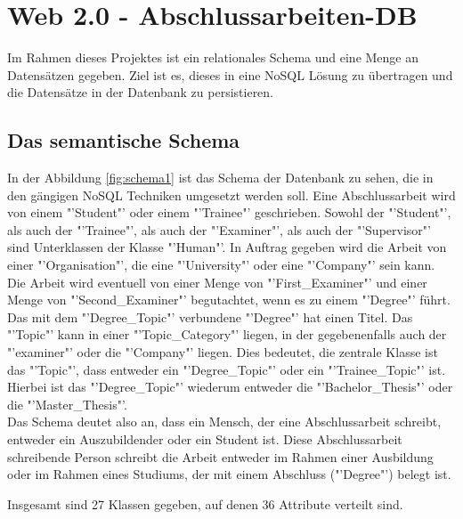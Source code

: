 \section{Web 2.0 - Abschlussarbeiten-DB}
Im Rahmen dieses Projektes ist ein relationales Schema und eine Menge an Datens\"atzen gegeben. Ziel ist es, dieses in eine NoSQL Lösung zu übertragen und die Datens\"atze in der Datenbank zu persistieren.

\subsection{Das semantische Schema}
In der Abbildung \ref{fig:schema1} ist das Schema der Datenbank zu sehen, die in den g\"angigen NoSQL Techniken umgesetzt werden soll. Eine Abschlussarbeit wird von einem "'Student"' oder einem "'Trainee"' geschrieben. Sowohl der "'Student"', als auch der "'Trainee"', als auch der "'Examiner"', als auch der "'Supervisor"' sind Unterklassen der Klasse "'Human"'. In Auftrag gegeben wird die Arbeit von einer "'Organisation"', die eine "'University"' oder eine "'Company"' sein kann. Die Arbeit wird eventuell von einer Menge von "'First\_Examiner"' und einer Menge von "'Second\_Examiner"' begutachtet, wenn es zu einem "'Degree"' f\"uhrt. Das mit dem "'Degree\_Topic"' verbundene "'Degree"' hat einen Titel. Das "'Topic"' kann in einer "'Topic\_Category"' liegen, in der gegebenenfalls auch der "'examiner"' oder die "'Company"' liegen. Dies bedeutet, die zentrale Klasse ist das "'Topic"', dass entweder ein "'Degree\_Topic"' oder ein "'Trainee\_Topic"' ist. Hierbei ist das "'Degree\_Topic"' wiederum entweder die "'Bachelor\_Thesis"' oder die "'Master\_Thesis"'.\\

Das Schema deutet also an, dass ein Mensch, der eine Abschlussarbeit schreibt, entweder ein Auszubildender oder ein Student ist. Diese Abschlussarbeit schreibende Person schreibt die Arbeit entweder im Rahmen einer Ausbildung oder im Rahmen eines Studiums, der mit einem Abschluss ("'Degree"') belegt ist. 

Insgesamt sind 27 Klassen gegeben, auf denen 36 Attribute verteilt sind.\\

